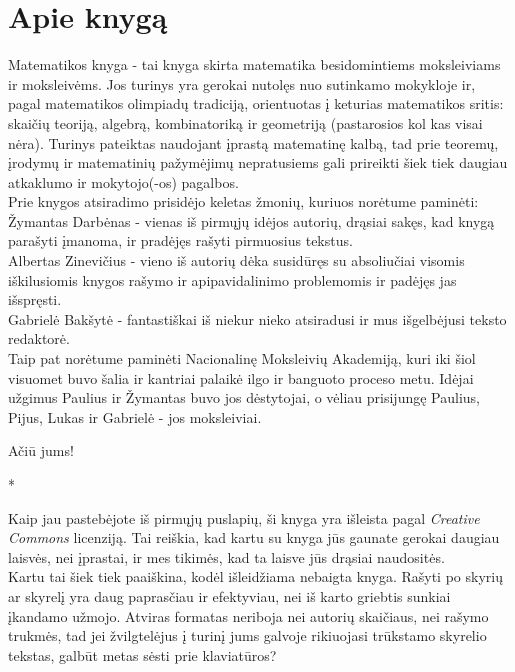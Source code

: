 \thispagestyle{empty}
\section*{Apie knygą}

Matematikos knyga - tai knyga skirta matematika besidomintiems moksleiviams
ir moksleivėms. Jos turinys yra gerokai nutolęs nuo sutinkamo mokykloje ir,
pagal matematikos olimpiadų tradiciją, orientuotas į keturias matematikos
sritis: skaičių teoriją, algebrą, kombinatoriką ir geometriją (pastarosios
kol kas visai nėra). Turinys pateiktas naudojant įprastą matematinę kalbą,
tad prie teoremų, įrodymų ir matematinių pažymėjimų nepratusiems gali
prireikti šiek tiek daugiau atkaklumo ir mokytojo(-os) pagalbos.\\

\noindent Prie knygos atsiradimo prisidėjo keletas žmonių, kuriuos norėtume
paminėti:\\

\noindent Žymantas Darbėnas - vienas iš pirmųjų idėjos autorių,
drąsiai sakęs, kad knygą parašyti įmanoma, ir pradėjęs rašyti pirmuosius
tekstus. \\

\noindent Albertas Zinevičius - vieno iš autorių dėka susidūręs su
absoliučiai visomis iškilusiomis knygos rašymo ir apipavidalinimo
problemomis ir padėjęs jas išspręsti. \\

\noindent Gabrielė Bakšytė - fantastiškai iš niekur nieko atsiradusi ir mus
išgelbėjusi teksto redaktorė. \\

\noindent Taip pat norėtume paminėti Nacionalinę Moksleivių Akademiją, kuri iki šiol
visuomet buvo šalia ir kantriai palaikė ilgo ir banguoto proceso metu.
Idėjai užgimus Paulius ir Žymantas buvo jos dėstytojai, o vėliau prisijungę
Paulius, Pijus, Lukas ir Gabrielė - jos moksleiviai. 
\begin{flushright}Ačiū jums!\end{flushright}

\begin{center}*\end{center}

\noindent Kaip jau pastebėjote iš pirmųjų puslapių, ši knyga yra išleista pagal
\emph{Creative Commons} licenziją. Tai reiškia, kad kartu su knyga jūs
gaunate gerokai daugiau laisvės, nei įprastai, ir mes tikimės, kad ta laisve
jūs drąsiai naudositės. \\

\noindent Kartu tai šiek tiek paaiškina, kodėl išleidžiama nebaigta knyga. Rašyti po
skyrių ar skyrelį yra daug paprasčiau ir efektyviau, nei iš karto griebtis
sunkiai įkandamo užmojo. Atviras formatas neriboja nei autorių skaičiaus,
nei rašymo trukmės, tad jei žvilgtelėjus į turinį jums galvoje rikiuojasi
trūkstamo skyrelio tekstas, galbūt metas sėsti prie klaviatūros?
